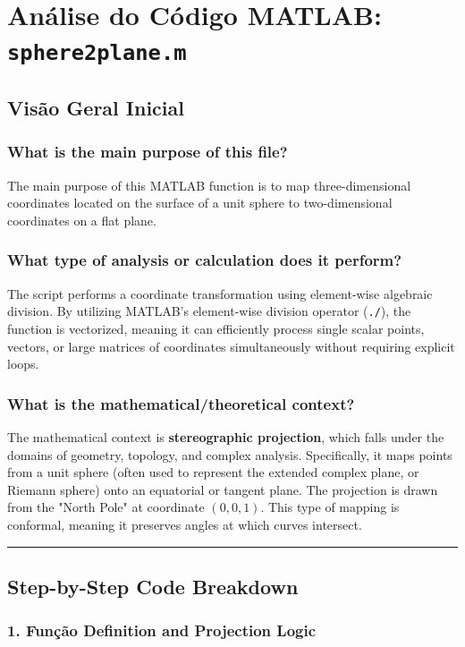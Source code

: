 
\chapter{Análise do Código MATLAB: \texttt{sphere2plane.m}}
\section{Visão Geral Inicial}

\subsection{What is the main purpose of this file?}
The main purpose of this MATLAB function is to map three-dimensional coordinates located on the surface of a unit sphere to two-dimensional coordinates on a flat plane. 

\subsection{What type of analysis or calculation does it perform?}
The script performs a coordinate transformation using element-wise algebraic division. By utilizing MATLAB's element-wise division operator (\texttt{./}), the function is vectorized, meaning it can efficiently process single scalar points, vectors, or large matrices of coordinates simultaneously without requiring explicit loops.

\subsection{What is the mathematical/theoretical context?}
The mathematical context is \textbf{stereographic projection}, which falls under the domains of geometry, topology, and complex analysis. Specifically, it maps points from a unit sphere (often used to represent the extended complex plane, or Riemann sphere) onto an equatorial or tangent plane. The projection is drawn from the "North Pole" at coordinate $(0,0,1)$. This type of mapping is conformal, meaning it preserves angles at which curves intersect.

\vspace{1em}
\hrule
\vspace{1em}

\section{Step-by-Step Code Breakdown}

\subsection{1. Função Definition and Projection Logic}

